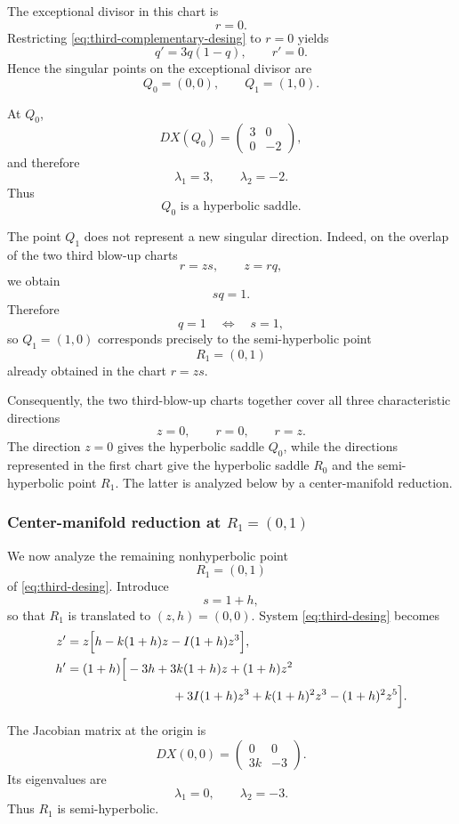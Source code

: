 \documentclass[11pt,reqno]{amsart}
\theoremstyle{plain}
\theoremstyle{definition}
\theoremstyle{remark}
\begin{document}
The exceptional divisor in this chart is
\[
r=0.
\]
Restricting \eqref{eq:third-complementary-desing} to $r=0$ yields
\[
q'=3q(1-q),
\qquad
r'=0.
\]
Hence the singular points on the exceptional divisor are
\[
Q_0=(0,0),
\qquad
Q_1=(1,0).
\]

At $Q_0$,
\[
D X(Q_0)
=
\begin{pmatrix}
3&0\\
0&-2
\end{pmatrix},
\]
and therefore
\[
\lambda_1=3,
\qquad
\lambda_2=-2.
\]
Thus
\[
\boxed{Q_0\text{ is a hyperbolic saddle}.}
\]

The point $Q_1$ does not represent a new singular direction. Indeed,
on the overlap of the two third blow-up charts
\[
r=zs,
\qquad
z=rq,
\]
we obtain
\[
sq=1.
\]
Therefore
\[
q=1
\quad\Longleftrightarrow\quad
s=1,
\]
so $Q_1=(1,0)$ corresponds precisely to the semi-hyperbolic point
\[
R_1=(0,1)
\]
already obtained in the chart $r=zs$.

Consequently, the two third-blow-up charts together cover all three
characteristic directions
\[
z=0,\qquad r=0,\qquad r=z.
\]
The direction $z=0$ gives the hyperbolic saddle $Q_0$, while the
directions represented in the first chart give the hyperbolic saddle
$R_0$ and the semi-hyperbolic point $R_1$. The latter is analyzed
below by a center-manifold reduction.

\subsubsection{Center-manifold reduction at $R_1=(0,1)$}
\label{subsubsec:center-R1}

We now analyze the remaining nonhyperbolic point
\[
R_1=(0,1)
\]
of \eqref{eq:third-desing}. Introduce
\[
s=1+h,
\]
so that $R_1$ is translated to $(z,h)=(0,0)$. System
\eqref{eq:third-desing} becomes
\begin{equation}
\label{eq:R1-translated}
\begin{aligned}
z'
&=
z\Big[
h-k(1+h)z-I(1+h)z^3
\Big],
\\
h'
&=
(1+h)\Big[
-3h
+3k(1+h)z
+(1+h)z^2
\\
&\hspace{30mm}
+3I(1+h)z^3
+k(1+h)^2z^3
-(1+h)^2z^5
\Big].
\end{aligned}
\end{equation}

The Jacobian matrix at the origin is
\[
D X(0,0)
=
\begin{pmatrix}
0&0\\
3k&-3
\end{pmatrix}.
\]
Its eigenvalues are
\[
\lambda_1=0,
\qquad
\lambda_2=-3.
\]
Thus $R_1$ is semi-hyperbolic.
\end{document}
